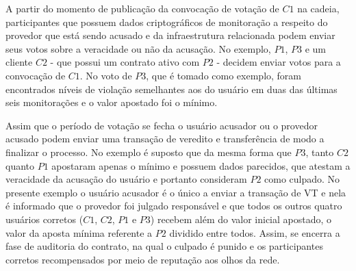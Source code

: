 %
A partir do momento de publicação da convocação de votação de $C1$ na cadeia, participantes que possuem dados criptográficos de monitoração a respeito do provedor que está sendo acusado e da infraestrutura relacionada podem enviar seus votos sobre a veracidade ou não da acusação. No exemplo, $P1$, $P3$ e um cliente $C2$ - que possui um contrato ativo com $P2$ - decidem enviar votos para a convocação de $C1$. No voto de $P3$, que é tomado como exemplo, foram encontrados níveis de violação semelhantes aos do usuário em duas das últimas seis monitorações e o valor apostado foi o mínimo.

%
Assim que o período de votação se fecha o usuário acusador ou o provedor acusado podem enviar uma transação de veredito e transferência de modo a finalizar o processo. No exemplo é suposto que da mesma forma que $P3$, tanto $C2$ quanto $P1$ apostaram apenas o mínimo e possuem dados parecidos, que atestam a veracidade da acusação do usuário e portanto consideram $P2$ como culpado. No presente exemplo o usuário acusador é o único a enviar a transação de \ac{VT} e nela é informado que o provedor foi julgado responsável e que todos os outros quatro usuários corretos ($C1$, $C2$, $P1$ e $P3$) recebem além do valor inicial apostado, o valor da aposta mínima referente a $P2$ dividido entre todos. Assim, se encerra a fase de auditoria do contrato, na qual o culpado é punido e os participantes corretos recompensados por meio de reputação aos olhos da rede.





